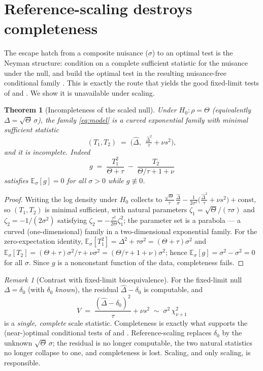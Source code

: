 \documentclass[11pt]{article}
\newtheorem{theorem}{Theorem}
\theoremstyle{remark}
\newtheorem{remark}{Remark}
\newcommand{\Dhat}{\hat{\Delta}}
\newcommand{\E}{\mathbb{E}}
\begin{document}
\section{Reference-scaling destroys completeness}\label{sec:incomplete}

The escape hatch from a composite nuisance ($\sigma$) to an optimal test is the Neyman structure: condition on a complete sufficient statistic for the nuisance under the null, and build the optimal test in the resulting nuisance-free conditional family \citep[Ch.~4]{lehmann2005}. This is exactly the route that yields the good fixed-limit tests of \citet{bhm1997} and \citet{bergerhsu1996}. We show it is unavailable under scaling.

\begin{theorem}[Incompleteness of the scaled null]\label{thm:incomplete}
Under $H_0:\rho=\Theta$ (equivalently $\Delta=\sqrt{\Theta}\,\sigma$), the family \eqref{eq:model} is a curved exponential family with minimal sufficient statistic
\[
(T_1,T_2)\;=\;\Big(\Dhat,\ \ \tfrac{\Dhat^2}{\tau}+\nu s^2\Big),
\]
and it is \emph{incomplete}. Indeed
\begin{equation}
g \;=\; \frac{T_1^2}{\Theta+\tau} \;-\; \frac{T_2}{\Theta/\tau + 1 + \nu}
\end{equation}
satisfies $\E_\sigma[g]=0$ for all $\sigma>0$ while $g\not\equiv 0$.
\end{theorem}

\begin{proof}
Writing the log density under $H_0$ collects to
$
\frac{\sqrt{\Theta}}{\tau}\,\frac{\Dhat}{\sigma}
-\frac{1}{2\sigma^2}\big(\tfrac{\Dhat^2}{\tau}+\nu s^2\big)+\text{const},
$
so $(T_1,T_2)$ is minimal sufficient, with natural parameters $\zeta_1=\sqrt{\Theta}/(\tau\sigma)$ and $\zeta_2=-1/(2\sigma^2)$ satisfying $\zeta_2=-\tfrac{\tau^2}{2\Theta}\zeta_1^2$; the parameter set is a parabola --- a curved (one-dimensional) family in a two-dimensional exponential family. For the zero-expectation identity, $\E_\sigma[T_1^2]=\Delta^2+\tau\sigma^2=(\Theta+\tau)\sigma^2$ and $\E_\sigma[T_2]=(\Theta+\tau)\sigma^2/\tau+\nu\sigma^2=(\Theta/\tau+1+\nu)\sigma^2$; hence $\E_\sigma[g]=\sigma^2-\sigma^2=0$ for all $\sigma$. Since $g$ is a nonconstant function of the data, completeness fails.
\end{proof}

\begin{remark}[Contrast with fixed-limit bioequivalence]\label{rem:fixed}
For the fixed-limit null $\Delta=\delta_0$ (with $\delta_0$ \emph{known}), the residual $\Dhat-\delta_0$ is computable, and
\[
V \;=\; \frac{(\Dhat-\delta_0)^2}{\tau} + \nu s^2 \;\sim\; \sigma^2\,\chi^2_{\nu+1}
\]
is a \emph{single, complete} scale statistic. Completeness is exactly what supports the (near-)optimal conditional tests of \citet{bhm1997} and \citet{bergerhsu1996}. Reference-scaling replaces $\delta_0$ by the unknown $\sqrt{\Theta}\,\sigma$; the residual is no longer computable, the two natural statistics no longer collapse to one, and completeness is lost. Scaling, and only scaling, is responsible.
\end{remark}
\end{document}
